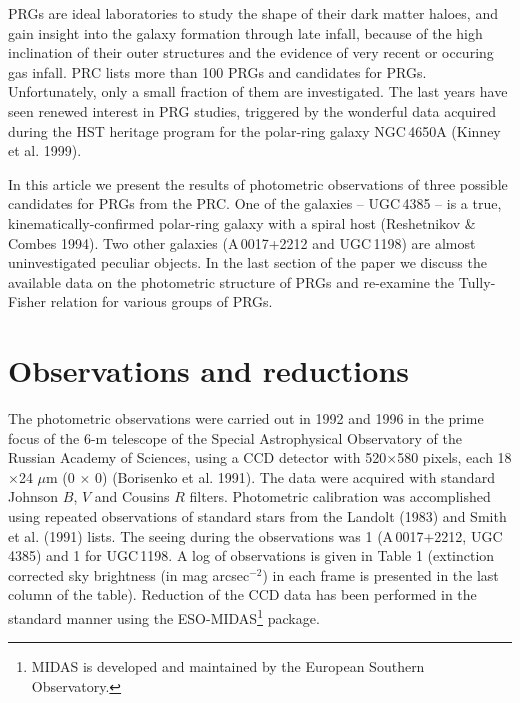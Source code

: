 \documentclass[]{aa}
\begin{document}
PRGs are ideal laboratories to study the shape of their dark matter
haloes, and gain insight into the galaxy formation through late
infall, because of the high inclination of their outer structures
and the evidence of very recent or occuring gas infall.
PRC lists more than 100 PRGs and candidates for PRGs. Unfortunately,
only a small fraction of them are investigated. The last years
have seen renewed interest in PRG studies, triggered
by the wonderful data acquired during the HST heritage program
for the polar-ring galaxy NGC\,4650A (Kinney et al. 1999).

In this article we present the results of photometric observations
of three possible candidates for PRGs from the PRC. One of the galaxies --
UGC\,4385 -- is a true, kinematically-confirmed polar-ring galaxy
with a spiral host (Reshetnikov \& Combes 1994). Two other galaxies
(A\,0017+2212 and UGC\,1198) are almost uninvestigated peculiar
objects. In the last section of the paper we discuss the available
data on the photometric structure of PRGs and re-examine the 
Tully-Fisher relation for various groups of PRGs. 

\section{Observations and reductions}

The photometric observations were carried out in 1992 and 1996
in the prime focus of the 6-m telescope of the Special Astrophysical
Observatory of the Russian Academy of Sciences, using a CCD detector
with 520$\times$580 pixels, each 18$\times$24 $\mu$m 
(0 $\times$ 0) (Borisenko et al. 1991).
The data were acquired with standard Johnson $B$, $V$ and Cousins
$R$ filters. Photometric calibration was accomplished using repeated
observations of standard stars from the Landolt (1983) and Smith et al.
(1991) lists. The seeing during the observations was 1
(A\,0017+2212, UGC\,4385) and 1 for UGC\,1198. A log of
observations is given in Table 1 (extinction corrected sky
brightness (in mag arcsec$^{-2}$) in each frame is presented in
the last column of the table). Reduction of the CCD data has been 
performed in the standard manner using the ESO-MIDAS\footnote{MIDAS is 
developed and maintained by the European Southern Observatory.}
package.
\end{document}
